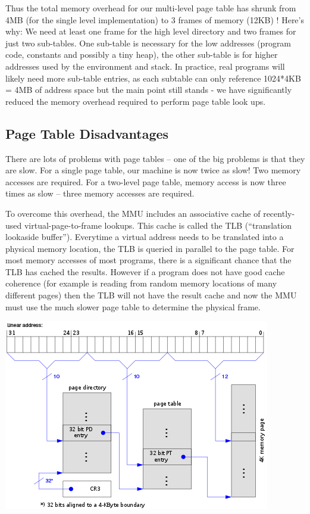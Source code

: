  Thus the total memory overhead for our multi-level page table has shrunk from 4MB (for the single level implementation) to 3 frames of memory (12KB) ! Here's why: We need at least one frame for the high level directory and two frames for just two sub-tables. One sub-table is necessary for the low addresses (program code, constants and possibly a tiny heap), the other sub-table is for higher addresses used by the environment and stack. In practice, real programs will likely need more sub-table entries, as each subtable can only reference 1024*4KB = 4MB of address space but the main point still stands - we have significantly reduced the memory overhead required to perform page table look ups.

\subsection{Page Table Disadvantages}
There are lots of problems with page tables -- one of the big problems is that they are slow. For a single page table, our machine is now twice as slow! Two memory accesses are required. For a two-level page table, memory access is now three times as slow -- three memory accesses are required.

To overcome this overhead, the MMU includes an associative cache of recently-used virtual-page-to-frame lookups. This cache is called the TLB (``translation lookaside buffer''). Everytime a virtual address needs to be translated into a physical memory location, the TLB is queried in parallel to the page table. For most memory accesses of most programs, there is a significant chance that the TLB has cached the results. However if a program does not have good cache coherence (for example is reading from random memory locations of many different pages) then the TLB will not have the result cache and now the MMU must use the much slower page table to determine the physical frame.

\begin{center}
\includegraphics[width=\textwidth]{ipc/images/440px-X86_Paging_4K.png}
\end{center}

